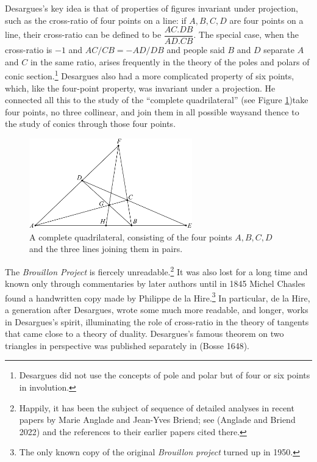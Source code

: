 Desargues's key idea is that of properties of figures invariant under projection, such as the cross-ratio of four points on a line: if $A,  B, C, D$ are four points on a line, their cross-ratio can be defined to be
$\dfrac{AC.DB}{AD.CB}$. The special case,  when the cross-ratio is $-1$ and $AC/CB=-AD/DB$ and people said $B$ and $D$ separate $A$ and $C$ in the same ratio, arises frequently in the theory of the poles and polars of conic section.\footnote{Desargues did not use the concepts of pole and polar but of four or six points in involution.} Desargues also had a more complicated property of six points, which, like the four-point property, was invariant under a projection. He connected all this to the study of the ``complete quadrilateral'' (see Figure \ref{figCompleteQuad})\emdash take four points, no three collinear, and join them in all possible ways\emdash  and thence to the study of conics through those four points. 

\begin{figure}
\includegraphics[width=200pt]{main/CompleteQuad3} 
\caption{A complete quadrilateral, consisting of the four points $A, B, C, D$ and the three lines joining them in pairs.}
\label{figCompleteQuad}
\end{figure}


The  \emph{Brouillon Project} is fiercely unreadable.\footnote{Happily, it has been the subject of sequence of detailed analyses in recent papers by Marie  Anglade and Jean-Yves Briend; see (Anglade and Briend 2022) and the references to their earlier papers cited there.} It was also lost for a long time and known only through commentaries by later authors until in 1845 Michel Chasles found a handwritten copy made by Philippe de la Hire.\footnote{The only known copy of the original \emph{Brouillon project} turned up in 1950.} In particular, de la Hire, a generation after Desargues, wrote some much more readable, and longer, works in Desargues's spirit, illuminating the role of cross-ratio in the theory of tangents that came close to a theory of duality. Desargues's famous theorem on two triangles in perspective was published separately in (Bosse 1648).

